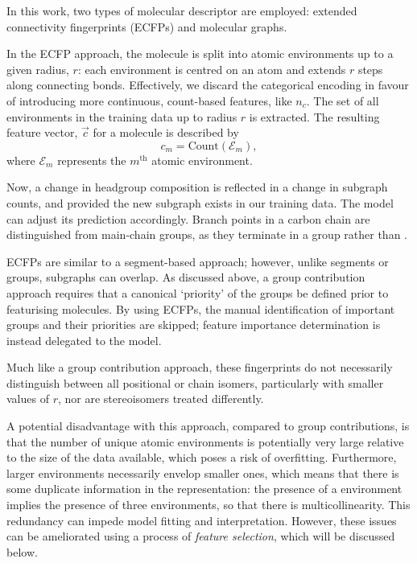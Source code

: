 In this work, two types of molecular descriptor are employed: extended
connectivity fingerprints (ECFPs)
\cite{rogersExtendedConnectivityFingerprints2010} and molecular graphs. 

In the ECFP approach, the molecule is split into atomic environments up to a
given radius, $r$: each environment is centred on an atom and extends $r$ steps
along connecting bonds. Effectively, we discard the categorical encoding in
favour of introducing more continuous, count-based features, like $n_c$. The set
of all environments in the training data up to radius $r$ is extracted. The
resulting feature vector, $\vec{c}$ for a molecule is described by
\begin{equation}
    \label{eq:ecfp}
    c_m = \text{Count}(\mathcal{E}_m),
\end{equation}
where $\mathcal{E}_m$ represents the $m^\text{th}$ atomic environment.

Now, a change in headgroup composition is reflected in a change in subgraph
counts, and provided the new subgraph exists in our training data. The model can
adjust its prediction accordingly. Branch points in a carbon chain are
distinguished from main-chain groups, as they terminate in a  group
rather than .

ECFPs are similar to a segment-based approach; however, unlike segments or
groups, subgraphs can overlap. As discussed above, a group contribution approach
requires that a canonical `priority' of the groups be defined prior to
featurising molecules. By using ECFPs, the manual identification of important
groups and their priorities are skipped; feature importance determination is
instead delegated to the model.

Much like a group contribution approach, these fingerprints do not necessarily
distinguish between all positional or chain isomers, particularly with smaller
values of $r$, nor are stereoisomers treated differently.

A potential disadvantage with this approach, compared to group contributions, is
that the number of unique atomic environments is potentially very large relative
to the size of the data available, which poses a risk of overfitting.
Furthermore, larger environments necessarily envelop smaller ones, which means
that there is some duplicate information in the representation: the presence of
a  environment implies the presence of three  environments,
so that there is multicollinearity. This redundancy can impede model fitting and
interpretation. However, these issues can be ameliorated using a process of
\emph{feature selection}, which will be discussed below.




